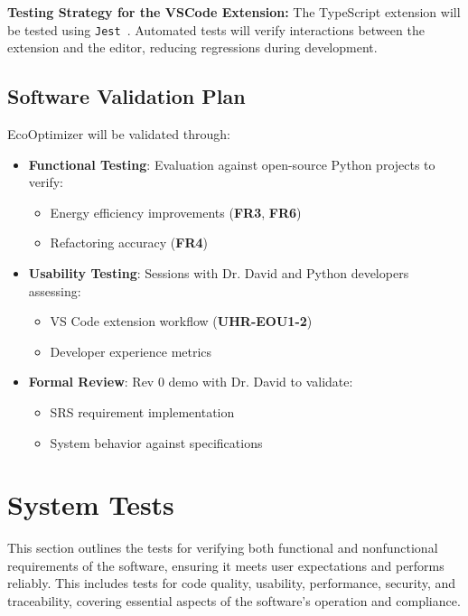 \documentclass[12pt, titlepage]{article}
\begin{document}
\noindent\textbf{Testing Strategy for the VSCode Extension:} The
TypeScript extension will be tested using \texttt{Jest}~\cite{jest}.
Automated tests will verify interactions between the extension and
the editor, reducing regressions during development.

\subsection{Software Validation Plan}

EcoOptimizer will be validated through:
\begin{itemize}
    \item \textbf{Functional Testing}: Evaluation against open-source Python projects to verify:
    \begin{itemize}
        \item Energy efficiency improvements (\textbf{FR3}, \textbf{FR6})
        \item Refactoring accuracy (\textbf{FR4})
    \end{itemize}
    
    \item \textbf{Usability Testing}: Sessions with Dr. David and Python developers assessing:
    \begin{itemize}
        \item VS Code extension workflow (\textbf{UHR-EOU1-2})
        \item Developer experience metrics
    \end{itemize}
    
    \item \textbf{Formal Review}: Rev 0 demo with Dr. David to validate:
    \begin{itemize}
        \item SRS requirement implementation
        \item System behavior against specifications
    \end{itemize}
\end{itemize}

\section{System Tests}

This section outlines the tests for verifying both functional and
nonfunctional requirements of the software, ensuring it meets user
expectations and performs reliably. This includes tests for code
quality, usability, performance, security, and traceability, covering
essential aspects of the software’s operation and compliance.
\end{document}
